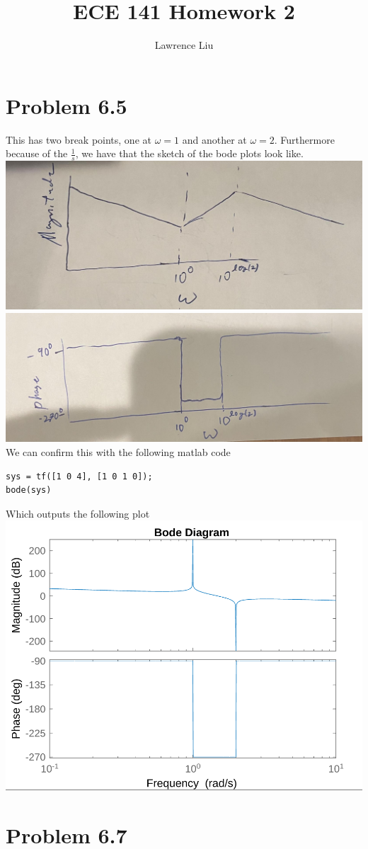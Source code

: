 \documentclass[12pt]{article}
\title{ECE 141 Homework 2}
\author{Lawrence Liu}
\begin{document}
\maketitle
\section*{Problem 6.5}

This has two break points, one at $\omega=1$ and another at $\omega=2$. Furthermore because of the $\frac{1}{s}$, we
have that the sketch of the bode plots look like.\\
\includegraphics[scale=0.2]{Problem1Fig1.png}\\
\includegraphics[scale=0.2]{Problem1Fig2.jpg}\\
We can confirm this with the following matlab code
\begin{verbatim}
sys = tf([1 0 4], [1 0 1 0]);
bode(sys)
\end{verbatim}
Which outputs the following plot\\
\includegraphics[scale=0.2]{Problem1Fig3.png}\\
\section*{Problem 6.7}
\end{document}
